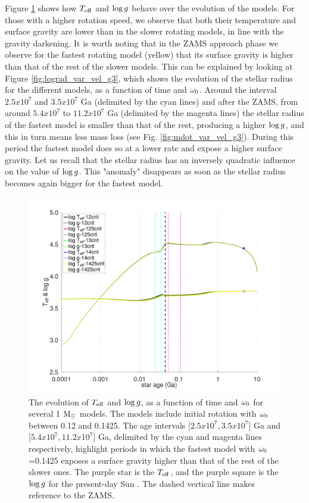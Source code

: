\documentclass[fleqn,usenatbib]{mnras}
\begin{document}
Figure \ref{fig:teff_logg_var_vel_g3} shows how $T_{\mathrm{eff}}$ and $\mathrm{log} \, g$ behave over the evolution of the models. For those with a higher rotation speed, we observe that both their temperature and surface gravity are lower than in the slower rotating models, in line with the gravity darkening. It is worth noting that in the ZAMS approach phase we observe for the fastest rotating model (yellow) that its surface gravity is higher than that of the rest of the slower models. This can be explained by looking at Figure \ref{fig:lograd_var_vel_g3}, which shows the evolution of the stellar radius for the different models, as a function of time and $\omega_{\mathrm{0}}$. Around the interval $2.5x10^{7}$ and $3.5x10^{7}$ Ga (delimited by the cyan lines) and after the ZAMS, from around $5.4x10^{7}$ to $11.2x10^{7}$ Ga (delimited by the magenta lines) the stellar radius of the fastest model is smaller than that of the rest, producing a higher $\mathrm{log} \, g$, and this in turn means less mass loss (see Fig. \ref{fig:mdot_var_vel_g3}). During this period the fastest model does so at a lower rate and expose a higher surface gravity. Let us recall that the stellar radius has an inversely quadratic influence on the value of $\mathrm{log} \, g$. This "anomaly" disappears as soon as the stellar radius becomes again bigger for the fastest model.\par


\begin{figure}
	\includegraphics[clip,width=\columnwidth]{figures/paper2/teff_logg_var_vel_g3.pdf}
    \caption{The evolution of $T_{\mathrm{eff}}$ and $\mathrm{log} \, g$, as a function of time and $\omega_{\mathrm{0}}$ for several 1 $\mathrm{M}_\odot$ models. The models include initial rotation with $\omega_{\mathrm{0}}$ between 0.12 and 0.1425. The age intervals [$2.5x10^{7},3.5x10^{7}$] Ga and [$5.4x10^{7},11.2x10^{7}$] Ga, delimited by the cyan and magenta lines respectively, highlight periods in which the fastest model with $\omega_{\mathrm{0}}$=0.1425 exposes a surface gravity higher than that of the rest of the slower ones. The purple star is the $T_{\mathrm{eff}}$, and the purple square is the $\mathrm{log} \, g$ for the present-day Sun \citep{Gill2012}. The dashed vertical line makes reference to the ZAMS.}
    \label{fig:teff_logg_var_vel_g3}
\end{figure}
\end{document}
